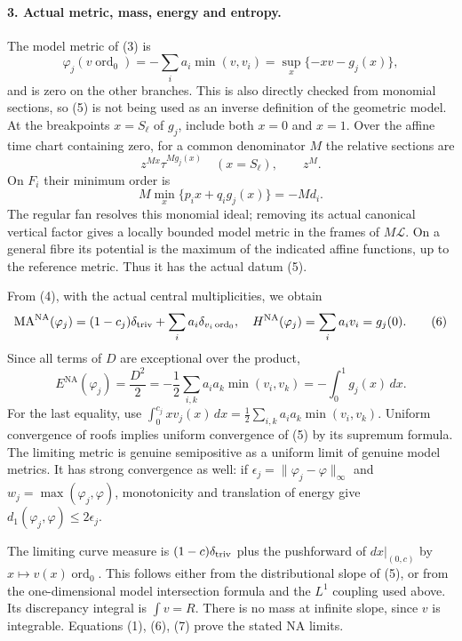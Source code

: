 \documentclass[11pt]{article}
\newcommand{\NA}{\mathrm{NA}}
\newcommand{\MA}{\mathrm{MA}}
\begin{document}
\paragraph{3. Actual metric, mass, energy and entropy.}
The model metric of (3) is
\[
 \varphi_j(v\operatorname{ord}_0)
       =-\sum_i a_i\min(v,v_i)
       =\sup_x\{-xv-g_j(x)\},                           \tag{5}
\]
and is zero on the other branches. This is also directly checked
from monomial sections, so (5) is not being used as an inverse
definition of the geometric model. At the breakpoints $x=S_\ell$
of $g_j$, include both $x=0$ and $x=1$. Over the affine time chart
containing zero, for a common denominator $M$ the relative sections are
\[
 z^{Mx}\tau^{M g_j(x)}\quad (x=S_\ell),\qquad z^M.
\]
On $F_i$ their minimum order is
\[
 M\min_x\{p_i x+q_i g_j(x)\}=-M d_i.
\]
The regular fan resolves this monomial ideal; removing its actual
canonical vertical factor gives a locally bounded model metric
in the frames of $M\mathcal L$. On a general fibre its potential
is the maximum of the indicated affine functions, up to the
reference metric. Thus it has the actual datum (5).

From (4), with the actual central multiplicities, we obtain
\[
 \MA^\NA(\varphi_j)=(1-c_j)\delta_{\rm triv}
                         +\sum_i a_i\delta_{v_i\operatorname{ord}_0},
 \quad H^\NA(\varphi_j)=\sum_i a_i v_i=g_j(0).             \tag{6}
\]
Since all terms of $D$ are exceptional over the product,
\[
 E^\NA(\varphi_j)=\frac{D^2}{2}
   =-\frac12\sum_{i,k}a_i a_k\min(v_i,v_k)
   =-\int_0^1g_j(x)\,dx.                                \tag{7}
\]
For the last equality, use
$\int_0^{c_j}x v_j(x)\,dx
=\frac12\sum_{i,k}a_i a_k\min(v_i,v_k)$.
Uniform convergence of roofs implies uniform convergence of (5)
by its supremum formula. The limiting metric is genuine semipositive
as a uniform limit of genuine model metrics. It has strong convergence
as well: if $\epsilon_j=\|\varphi_j-\varphi\|_\infty$ and
$w_j=\max(\varphi_j,\varphi)$, monotonicity and translation of energy
give $d_1(\varphi_j,\varphi)\le2\epsilon_j$.

The limiting curve measure is $(1-c)\delta_{\rm triv}$ plus the
pushforward of $dx|_{(0,c)}$ by $x\mapsto v(x)\operatorname{ord}_0$.
This follows either from the distributional slope of (5), or from
the one-dimensional model intersection formula and the $L^1$
coupling used above. Its discrepancy integral is $\int v=R$.
There is no mass at infinite slope, since $v$ is integrable.
Equations (1), (6), (7) prove the stated NA limits.
\end{document}
